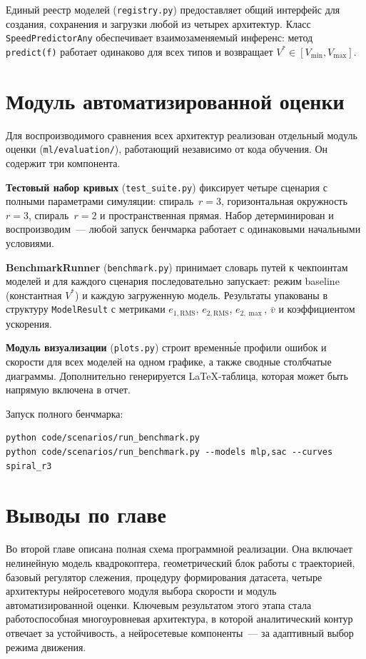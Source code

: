 Единый реестр моделей (\texttt{registry.py}) предоставляет общий интерфейс для создания, сохранения и загрузки любой из четырех архитектур. Класс \texttt{SpeedPredictorAny} обеспечивает взаимозаменяемый инференс: метод \texttt{predict(f)} работает одинаково для всех типов и возвращает $V^{\ast} \in [V_{\min}, V_{\max}]$.

\section{Модуль автоматизированной оценки}

Для воспроизводимого сравнения всех архитектур реализован отдельный модуль оценки (\texttt{ml/evaluation/}), работающий независимо от кода обучения. Он содержит три компонента.

\textbf{Тестовый набор кривых} (\texttt{test\_suite.py}) фиксирует четыре сценария с полными параметрами симуляции: спираль~$r{=}3$, горизонтальная окружность~$r{=}3$, спираль~$r{=}2$ и пространственная прямая. Набор детерминирован и воспроизводим~--- любой запуск бенчмарка работает с одинаковыми начальными условиями.

\textbf{BenchmarkRunner} (\texttt{benchmark.py}) принимает словарь путей к чекпоинтам моделей и для каждого сценария последовательно запускает: режим baseline (константная $V^{\ast}$) и каждую загруженную модель. Результаты упакованы в структуру \texttt{ModelResult} с метриками $e_{1,\mathrm{RMS}}$, $e_{2,\mathrm{RMS}}$, $e_{2,\max}$, $\bar{v}$ и коэффициентом ускорения.

\textbf{Модуль визуализации} (\texttt{plots.py}) строит временны́е профили ошибок и скорости для всех моделей на одном графике, а также сводные столбчатые диаграммы. Дополнительно генерируется \LaTeX-таблица, которая может быть напрямую включена в отчет.

Запуск полного бенчмарка:
\begin{verbatim}
python code/scenarios/run_benchmark.py
python code/scenarios/run_benchmark.py --models mlp,sac --curves spiral_r3
\end{verbatim}

\section{Выводы по главе}

Во второй главе описана полная схема программной реализации. Она включает нелинейную модель квадрокоптера, геометрический блок работы с траекторией, базовый регулятор слежения, процедуру формирования датасета, четыре архитектуры нейросетевого модуля выбора скорости и модуль автоматизированной оценки. Ключевым результатом этого этапа стала работоспособная многоуровневая архитектура, в которой аналитический контур отвечает за устойчивость, а нейросетевые компоненты~--- за адаптивный выбор режима движения.
